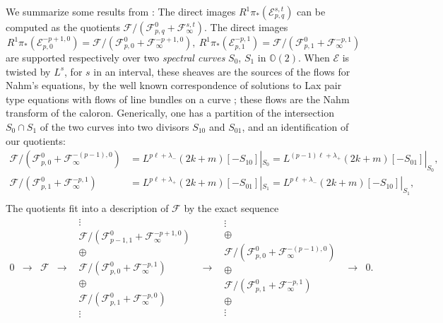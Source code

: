 \documentclass[12pt]{article}
\theoremstyle{definition}
\theoremstyle{remark}
\numberwithin{theorem}{section}
\def\bO{{\mathbb {O}}}
\def\pE{{\mathcal E}}
\def\pF{{\mathcal F}}
\begin{document}
We summarize some results from  \cite{Charbonneau:2006gu}: The direct images $R^1\pi_*(\pE_{p,q}^{s,t})$ can be computed as the quotients $\pF/(\pF^0_{p,q}+\pF_\infty^{s,t})$. The direct images  
$$R^1\pi_*(\pE_{p,0}^{-p+1,0})=\pF/(\pF^0_{p,0}+\pF_\infty^{-p+1,0}), \ R^1\pi_*(\pE_{p,1}^{-p,1}) = \pF/(\pF^0_{p,1}+\pF_\infty^{-p,1})$$ are supported respectively over two {\it spectral curves}  $S_0$, $S_1$ in $\bO(2)$. When $\pE$ is twisted by $L^s$, for $s$ in an interval, these sheaves are the sources of the flows for Nahm's equations, by the well known correspondence of solutions to Lax pair type equations with flows of line bundles on a curve \cite{Nahm:1982jt, Hitchin:1983ay, Griffiths}; these flows are the Nahm transform of the caloron. Generically, one has a partition of the intersection $S_0\cap S_1$ of the two curves into two divisors $S_{10}  $ and $S_{01}$, and an identification of our quotients:
\begin{align*}
{\scriptstyle \pF}/{\scriptstyle(\pF^0_{p,0}+\pF_\infty^{-(p-1),0})} &=
 L^{p\ell+\lambda_-}(2k+m)[-S_{10}]|_{S_0} =
L^{(p-1)\ell+\lambda_+}(2k+m)[-S_{01}]|_{S_0},\\
{\scriptstyle \pF}/{\scriptstyle(\pF^0_{p,1}+\pF_\infty^{-p,1})} &=
L^{p\ell+\lambda_+}(2k+m)[-S_{01}]|_{S_1} =
L^{p\ell+\lambda_-}(2k+m)[-S_{10}]|_{S_1},\\
\end{align*}
The quotients  fit into a description of $\pF$ by the exact sequence
\begin{equation}\label{description-of-F}
 \begin{matrix}
0&\rightarrow&\pF&\rightarrow&
\begin{matrix}\vdots\\ \pF/(\pF^0_{p-1,1}+\pF_\infty^{-p+1,0}) \\ \oplus\\
\pF/(\pF^0_{p,0}+\pF_\infty^{-p,1}) \\ \oplus\\ \pF/(\pF^0_{p,1}+\pF_\infty^{-p,0}) \\ \vdots
\end{matrix}
&\rightarrow &
\begin{matrix}
\vdots\\ \oplus\\ \pF/(\pF^0_{p,0}+ \pF_\infty^{-(p-1),0})\\
\oplus\\ \pF/(\pF^0_{p,1}+\pF_\infty^{-p,1})\\ \oplus\\ \vdots
\end{matrix}
&\rightarrow &0.
\end{matrix}
\end{equation}
\end{document}
